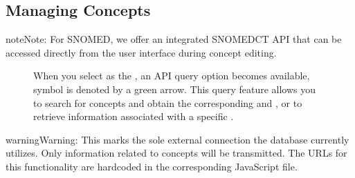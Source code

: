 \documentclass[a4paper,10pt,english]{sphinxmanual}
\begin{document}
\subsection{Managing Concepts}
\label{\detokenize{TechnicalDetails:managing-concepts}}
\begin{sphinxadmonition}{note}{Note:}
\sphinxAtStartPar
For SNOMED, we offer an integrated SNOMED\sphinxhyphen{}CT API that can be accessed directly from the user interface during concept editing.

\begin{figure}[H]
\centering
\capstart

\noindent{}
\caption{When you select  as the , an API query option becomes available, symbol is denoted by a green arrow. This query feature allows you to search for  concepts and obtain the corresponding  and , or to retrieve information associated with a specific .}\label{\detokenize{TechnicalDetails:id9}}\end{figure}

\begin{sphinxadmonition}{warning}{Warning:}
\sphinxAtStartPar
This marks the sole external connection the database currently utilizes. Only information related to concepts will be transmitted. The URLs for this functionality are hardcoded in the corresponding JavaScript file.

\begin{sphinxVerbatim}[commandchars=\\\{\}]
\end{sphinxVerbatim}
\end{sphinxadmonition}
\end{sphinxadmonition}
\end{document}
